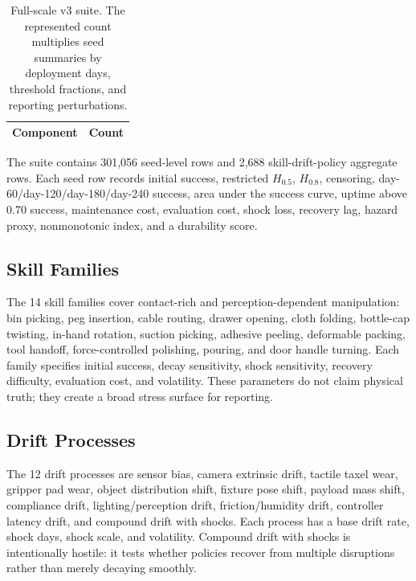 \documentclass{article}
\newcommand{\half}{H_{0.5}}
\newcommand{\life}[1]{H_{#1}}
\begin{document}
\begin{table}[t]
\centering
\caption{Full-scale v3 suite. The represented count multiplies seed summaries
by deployment days, threshold fractions, and reporting perturbations.}
\label{tab:scale}
\begin{tabular}{@{}lr@{}}
\toprule
Component & Count \\
\midrule

\end{tabular}
\end{table}

The suite contains 301,056 seed-level rows and 2,688
skill-drift-policy aggregate rows. Each seed row records initial success,
restricted $\half$, $\life{0.8}$, censoring, day-60/day-120/day-180/day-240
success, area under the success curve, uptime above 0.70 success, maintenance
cost, evaluation cost, shock loss, recovery lag, hazard proxy, nonmonotonic
index, and a durability score.

\subsection{Skill Families}

The 14 skill families cover contact-rich and perception-dependent manipulation:
bin picking, peg insertion, cable routing, drawer opening, cloth folding,
bottle-cap twisting, in-hand rotation, suction picking, adhesive peeling,
deformable packing, tool handoff, force-controlled polishing, pouring, and door
handle turning. Each family specifies initial success, decay sensitivity,
shock sensitivity, recovery difficulty, evaluation cost, and volatility. These
parameters do not claim physical truth; they create a broad stress surface for
reporting.

\subsection{Drift Processes}

The 12 drift processes are sensor bias, camera extrinsic drift, tactile taxel
wear, gripper pad wear, object distribution shift, fixture pose shift, payload
mass shift, compliance drift, lighting/perception drift, friction/humidity
drift, controller latency drift, and compound drift with shocks. Each process
has a base drift rate, shock days, shock scale, and volatility. Compound drift
with shocks is intentionally hostile: it tests whether policies recover from
multiple disruptions rather than merely decaying smoothly.
\end{document}
